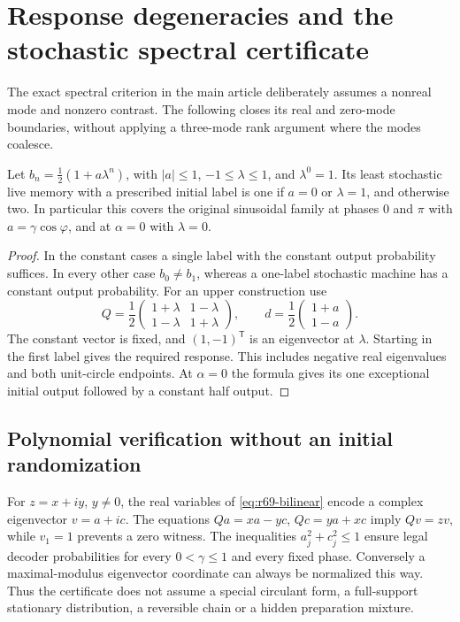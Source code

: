 \section{Response degeneracies and the stochastic spectral certificate}\label{sec:supp-r69}
The exact spectral criterion in the main article deliberately assumes a nonreal mode and nonzero contrast. The following closes its real and zero-mode boundaries, without applying a three-mode rank argument where the modes coalesce.

\begin{proposition}\label{prop:r69-degenerate}
Let $b_n=\tfrac12(1+a\lambda^n)$, with $|a|\le1$, $-1\le\lambda\le1$, and $\lambda^0=1$. Its least stochastic live memory with a prescribed initial label is one if $a=0$ or $\lambda=1$, and otherwise two. In particular this covers the original sinusoidal family at phases $0$ and $\pi$ with $a=\gamma\cos\varphi$, and at $\alpha=0$ with $\lambda=0$.
\end{proposition}
\begin{proof}
In the constant cases a single label with the constant output probability suffices. In every other case $b_0\ne b_1$, whereas a one-label stochastic machine has a constant output probability. For an upper construction use
\[
 Q=\frac12\begin{pmatrix}1+\lambda&1-\lambda\\1-\lambda&1+\lambda\end{pmatrix},
 \qquad d=\frac12\begin{pmatrix}1+a\\1-a\end{pmatrix}.
\]
The constant vector is fixed, and $(1,-1)^{\mathsf T}$ is an eigenvector at $\lambda$. Starting in the first label gives the required response. This includes negative real eigenvalues and both unit-circle endpoints. At $\alpha=0$ the formula gives its one exceptional initial output followed by a constant half output.
\end{proof}

\subsection{Polynomial verification without an initial randomization}
For $z=x+iy$, $y\ne0$, the real variables of \eqref{eq:r69-bilinear} encode a complex eigenvector $v=a+ic$. The equations $Qa=xa-yc$, $Qc=ya+xc$ imply $Qv=zv$, while $v_1=1$ prevents a zero witness. The inequalities $a_j^2+c_j^2\le1$ ensure legal decoder probabilities for every $0<\gamma\le1$ and every fixed phase. Conversely a maximal-modulus eigenvector coordinate can always be normalized this way. Thus the certificate does not assume a special circulant form, a full-support stationary distribution, a reversible chain or a hidden preparation mixture.

